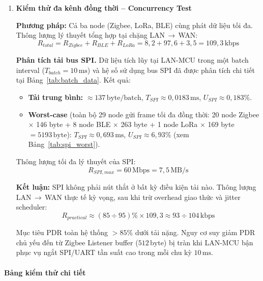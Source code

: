 \begin{enumerate}
            \item \textbf{Kiểm thử đa kênh đồng thời -- Concurrency Test}

            \textbf{Phương pháp:} Cả ba node (Zigbee, LoRa, BLE) cùng phát dữ liệu tối đa. Thông lượng lý thuyết tổng hợp tại chặng LAN$\,\rightarrow\,$WAN:
            \[
                R_{total} = R_{Zigbee} + R_{BLE} + R_{LoRa}
                            = 8{,}2 + 97{,}6 + 3{,}5
                            = 109{,}3\,\text{kbps}
            \]

            \textbf{Phân tích tải bus SPI.} Dữ liệu tích lũy tại LAN-MCU trong một batch interval ($T_{batch} = 10\,\text{ms}$) và hệ số sử dụng bus SPI đã được phân tích chi tiết tại Bảng~\ref{tab:batch_data}. Kết quả:

            \begin{itemize}
                \item \textbf{Tải trung bình:} $\approx 137\,\text{byte/batch}$, $T_{SPI} \approx 0{,}0183\,\text{ms}$, $U_{SPI} \approx 0{,}183\%$.
                \item \textbf{Worst-case} (toàn bộ 29 node gửi frame tối đa đồng thời: 20 node Zigbee $\times$ 146 byte + 8 node BLE $\times$ 263 byte + 1 node LoRa $\times$ 169 byte $= 5193\,\text{byte}$): $T_{SPI} \approx 0{,}693\,\text{ms}$, $U_{SPI} \approx 6{,}93\%$ (xem Bảng~\ref{tab:spi_worst}).
            \end{itemize}

            Thông lượng tối đa lý thuyết của SPI:
            \[
                R_{SPI,max} = 60\,\text{Mbps} = 7{,}5\,\text{MB/s}
            \]

            \textbf{Kết luận:} SPI không phải nút thắt ở bất kỳ điều kiện tải nào. Thông lượng LAN$\,\rightarrow\,$WAN thực tế kỳ vọng, sau khi trừ overhead giao thức và jitter scheduler:
            \[
                R_{practical} \approx (85 \div 95)\% \times 109{,}3 \approx 93 \div 104\,\text{kbps}
            \]

            Mục tiêu PDR toàn hệ thống $> 85\%$ dưới tải nặng. Nguy cơ suy giảm PDR chủ yếu đến từ Zigbee Listener buffer ($512\,\text{byte}$) bị tràn khi LAN-MCU bận phục vụ ngắt SPI/UART tần suất cao trong mỗi chu kỳ $10\,\text{ms}$.

        \end{enumerate}

        \paragraph{Bảng kiểm thử chi tiết}

